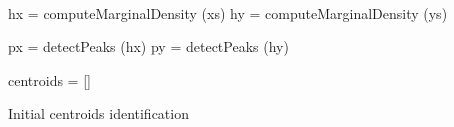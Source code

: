 \begin{algorithm}[h]

~\\
 hx = computeMarginalDensity (xs)\;
 hy = computeMarginalDensity (ys)\;

 px = detectPeaks (hx)\;
 py = detectPeaks (hy)\;

 centroids = []\;
 \caption{Initial centroids identification}\label{alg:grid_creation}
\end{algorithm}
